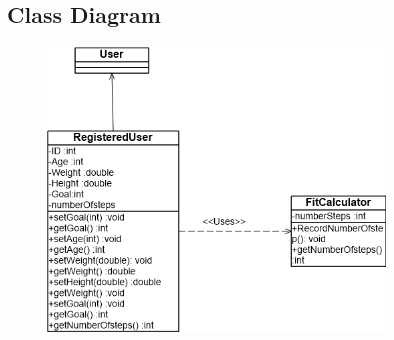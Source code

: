 \subsection{Class Diagram}
\begin{figure}[!h]
  \includegraphics[width=0.8\textwidth]{Fitness/FitnessClassDgm.png}
\end{figure}
